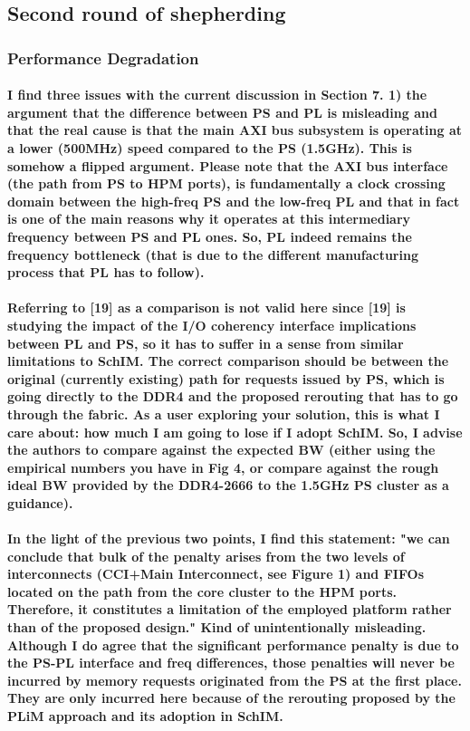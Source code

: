     \subsection{Second round of shepherding}
        \subsubsection{Performance Degradation}
            \paragraph{I find three issues with the current discussion in Section 7. 1) the argument that the difference between PS and PL is misleading and that the real cause is that the main AXI bus subsystem is operating at a lower (500MHz) speed compared to the PS (1.5GHz). This is somehow a flipped argument. Please note that the AXI bus interface (the path from PS to HPM ports), is fundamentally a clock crossing domain between the high-freq PS and the low-freq PL and that in fact is one of the main reasons why it operates at this intermediary frequency between PS and PL ones. So, PL indeed remains the frequency bottleneck (that is due to the different manufacturing process that PL has to follow).}

            \paragraph{Referring to [19] as a comparison is not valid here since [19] is studying the impact of the I/O coherency interface implications between PL and PS, so it has to suffer in a sense from similar limitations to SchIM. The correct comparison should be between the original (currently existing) path for requests issued by PS, which is going directly to the DDR4 and the proposed rerouting that has to go through the fabric. As a user exploring your solution, this is what I care about: how much I am going to lose if I adopt SchIM. So, I advise the authors to compare against the expected BW (either using the empirical numbers you have in Fig 4, or compare against the rough ideal BW provided by the DDR4-2666 to the 1.5GHz PS cluster as a guidance).}

            \paragraph{In the light of the previous two points, I find this statement: "we can conclude that bulk of the penalty arises from the two levels of interconnects (CCI+Main Interconnect, see Figure 1) and FIFOs located on the path from the core cluster to the HPM ports. Therefore, it constitutes a limitation of the employed platform rather than of the proposed design." Kind of unintentionally misleading. Although I do agree that the significant performance penalty is due to the PS-PL interface and freq differences, those penalties will never be incurred by memory requests originated from the PS at the first place. They are only incurred here because of the rerouting proposed by the PLiM approach and its adoption in SchIM.}

